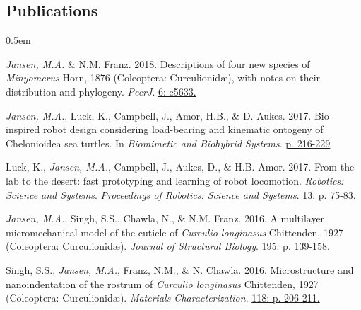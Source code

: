 \documentclass[11pt,a4paper]{extarticle}
\begin{document}
\subsection*{Publications}
		\begin{description}
		\itemsep0.5em
		\item \textit{Jansen, M.A.} \& N.M. Franz. 2018. Descriptions of four new species of \textit{Minyomerus} Horn, 1876 (Coleoptera: Curculionid\ae), with notes on their distribution and phylogeny. \textit{PeerJ}. \href{https://peerj.com/articles/5633/}{6: e5633.}
		\item \textit{Jansen, M.A.}, Luck, K., Campbell, J., Amor, H.B., \& D. Aukes. 2017. Bio-inspired robot design considering load-bearing and kinematic ontogeny of Chelonioidea sea turtles. In \textit{Biomimetic and Biohybrid Systems}. \href{http://www.springer.com/us/book/9783319635361}{p. 216-229}
		\item Luck, K., \textit{Jansen, M.A.}, Campbell, J., Aukes, D., \& H.B. Amor. 2017. From the lab to the desert: fast prototyping and learning of robot locomotion. \textit{Robotics: Science and Systems}. \textit{Proceedings of Robotics: Science and Systems}. \href{http://www.roboticsproceedings.org/rss13/p75.html}{13: p. 75-83}.
		\item \textit{Jansen, M.A.}, Singh, S.S., Chawla, N., \& N.M. Franz. 2016. A multilayer micromechanical model of the cuticle of \textit{Curculio longinasus} Chittenden, 1927 (Coleoptera: Curculionid\ae). \textit{Journal of Structural Biology}. \href{http://www.sciencedirect.com/science/article/pii/S1047847716300922}{195: p. 139-158.}
		\item Singh, S.S., \textit{Jansen, M.A.}, Franz, N.M., \& N. Chawla. 2016. Microstructure and nanoindentation of the rostrum of \textit{Curculio longinasus} Chittenden, 1927 (Coleoptera: Curculionid\ae). \textit{Materials Characterization}. \href{http://www.sciencedirect.com/science/article/pii/S1044580316301619}{118: p. 206-211.}
	\end{description}
\end{document}

